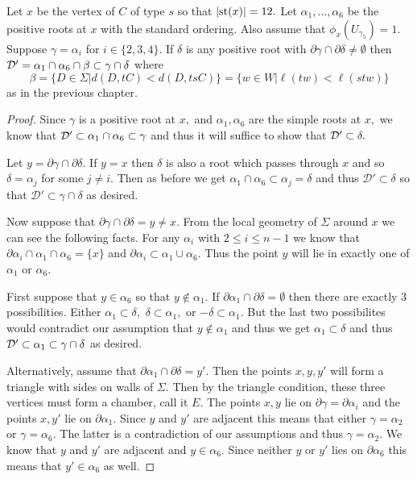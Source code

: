 \documentclass[class=book, crop=false]{standalone}
\begin{document}
\begin{lemma}
	\label{lem:336f2D}
	Let $x$ be the vertex of $C$ of type $s$ so that $|\mathrm{st}(x)|=12.$ Let $\alpha_1,\dots,\alpha_6$ be the positive roots at $x$ with the standard ordering. Also assume that $\phi_x(U_{\gamma_5})=1.$ Suppose $\gamma=\alpha_i$ for $i\in \{2,3,4\}.$ If $\delta$ is any positive root with $\partial\gamma\cap \partial\delta\neq \emptyset$ then $\mathcal{D}'=\alpha_1\cap \alpha_6\cap \beta\subset \gamma\cap \delta$ where 
	\[
	\beta=\{D\in \Sigma|d(D,tC)<d(D,tsC)\}=\{w\in W|\ell(tw)<\ell(stw)\}
	\]
	as in the previous chapter.
\end{lemma}
\begin{proof}
	Since $\gamma$ is a positive root at $x,$ and $\alpha_1,\alpha_6$ are the simple roots at $x,$ we know that $\mathcal{D}'\subset \alpha_1\cap \alpha_6\subset \gamma$ and thus it will suffice to show that $\mathcal{D}'\subset \delta.$

	Let $y=\partial\gamma \cap \partial \delta.$ If $y=x$ then $\delta$ is also a root which passes through $x$ and so $\delta=\alpha_j$ for some $j\neq i.$ Then as before we get $\alpha_1\cap \alpha_6\subset \alpha_j=\delta$ and thus $\mathcal{D}'\subset \delta$ so that $\mathcal{D}'\subset \gamma\cap \delta$ as desired.

	Now suppose that $\partial \gamma\cap \partial \delta=y\neq x.$ From the local geometry of $\Sigma$ around $x$ we can see the following facts. For any $\alpha_i$ with $2\le i\le n-1$ we know that $\partial\alpha_i\cap \alpha_1\cap \alpha_6=\{x\}$ and $\partial\alpha_i\subset \alpha_1\cup\alpha_6.$ Thus the point $y$ will lie in exactly one of $\alpha_1$ or $\alpha_6.$

	First suppose that $y\in \alpha_6$ so that $y\not\in \alpha_1.$ If $\partial\alpha_1\cap \partial\delta=\emptyset$ then there are exactly 3 possibilities. Either $\alpha_1\subset \delta,$ $\delta\subset\alpha_1,$ or $-\delta\subset \alpha_1.$ But the last two possibilites would contradict our assumption that $y\not\in \alpha_1$ and thus we get $\alpha_1\subset \delta$ and thus $\mathcal{D}'\subset \alpha_1\subset \gamma\cap\delta$ as desired.

	Alternatively, assume that $\partial\alpha_1\cap \partial\delta=y'.$ Then the points $x,y,y'$ will form a triangle with sides on walls of $\Sigma.$ Then by the triangle condition, these three vertices must form a chamber, call it $E.$ The points $x,y$ lie on $\partial\gamma=\partial\alpha_i$ and the points $x,y'$ lie on $\partial\alpha_1.$ Since $y$ and $y'$ are adjacent this means that either $\gamma=\alpha_2$ or $\gamma=\alpha_6.$ The latter is a contradiction of our assumptions and thus $\gamma=\alpha_2.$ We know that $y$ and $y'$ are adjacent and $y\in \alpha_6.$ Since neither $y$ or $y'$ lies on $\partial\alpha_6$ this means that $y'\in \alpha_6$ as well.


\end{proof}
\end{document}

